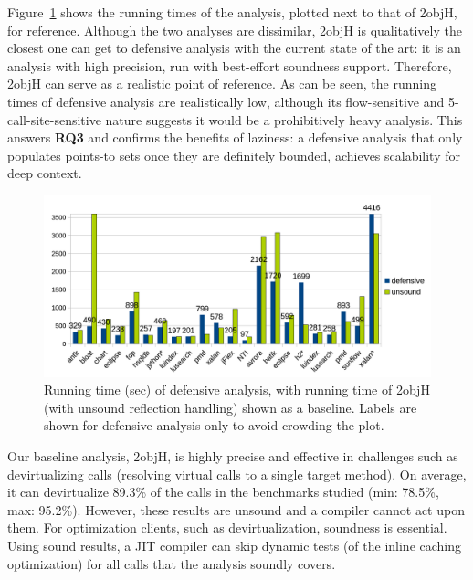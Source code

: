 Figure~\ref{fig:time} shows the running times of the analysis, plotted
next to that of 2objH, for reference.  Although the two analyses are
dissimilar, 2objH is qualitatively the closest one can get to
defensive analysis with the current state of the art: it is an
analysis with high precision, run with best-effort soundness
support. Therefore, 2objH can serve as a realistic point of reference.
As can be seen, the running times of defensive analysis are
realistically low, although its flow-sensitive and
5-call-site-sensitive nature suggests it would be a prohibitively
heavy analysis. This answers \textbf{RQ3} and confirms the benefits of
laziness: a defensive analysis that only populates points-to sets once
they are definitely bounded, achieves scalability for deep context.

\begin{figure}[tbhp]
  \begin{minipage}[b]{\linewidth}
    \centering
    \includegraphics[width=\linewidth]{assets/defensive/time.pdf}
  \end{minipage}
  \caption{Running time (sec) of defensive analysis, with running time of
    2objH (with unsound reflection handling) shown as a
    baseline. Labels are shown for defensive analysis only to avoid
    crowding the plot.}
    \label{fig:time}
\end{figure}


Our baseline analysis, 2objH, is highly precise and effective in
challenges such as devirtualizing calls (resolving virtual calls to a
single target method). On average, it can devirtualize 89.3\% of the
calls in the benchmarks studied (min: 78.5\%, max: 95.2\%). However,
these results are unsound and a compiler cannot act upon them. For
optimization clients, such as devirtualization, soundness is
essential. Using sound results, a JIT compiler can skip dynamic tests
(of the inline caching optimization) for all calls that the analysis
soundly covers.

